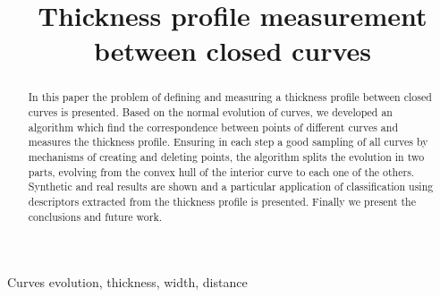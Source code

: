 \documentclass{article}
\title{Thickness profile measurement between closed curves}
\begin{document}
\maketitle

\begin{abstract}
In this paper the problem of defining and measuring a thickness profile between closed curves is presented. Based on the normal evolution of curves, we developed an algorithm which find the correspondence between points of different curves and measures the thickness profile. Ensuring in each step a good sampling of all curves by mechanisms of creating and deleting points, the algorithm splits the evolution in two parts, evolving from the convex hull of the interior curve to each one of the others. Synthetic and real results are shown and a particular application of classification using descriptors extracted from the thickness profile is presented. Finally we present the conclusions and future work.
\end{abstract}

\begin{keywords}
Curves evolution, thickness, width, distance
\end{keywords}
\end{document}
